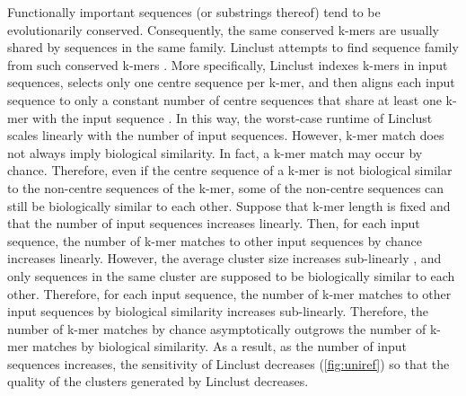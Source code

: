 \documentclass[11pt,letterpaper]{article}
\begin{document}
Functionally important sequences (or substrings thereof) tend to be evolutionarily conserved.
Consequently, the same conserved k-mers are usually shared by sequences in the same family.
Linclust attempts to find sequence family from such conserved k-mers \citep{steinegger2017linclust}.
More specifically, 
	Linclust indexes k-mers in input sequences, 
	selects only one centre sequence per k-mer,
	and then aligns each input sequence to only a constant number of centre sequences that share at least one k-mer with the input sequence \citep{steinegger2017linclust}.
In this way, the worst-case runtime of Linclust scales linearly with the number of input sequences.
However, k-mer match does not always imply biological similarity.
In fact, a k-mer match may occur by chance.
Therefore,
	even if the centre sequence of a k-mer is not biological similar to the non-centre sequences of the k-mer, 
	some of the non-centre sequences can still be biologically similar to each other.
Suppose that k-mer length is fixed and that the number of input sequences increases linearly.
Then, for each input sequence,
	the number of k-mer matches to other input sequences by chance increases linearly.
However,
	the average cluster size increases sub-linearly \citep[Fig. 3]{suzek2014uniref},
	and only sequences in the same cluster are supposed to be biologically similar to each other.
Therefore,
	for each input sequence,
	the number of k-mer matches to other input sequences by biological similarity increases sub-linearly.
Therefore, the number of k-mer matches by chance asymptotically outgrows the number of k-mer matches by biological similarity.
As a result, as the number of input sequences increases, 
	the sensitivity of Linclust decreases (\cref{fig:uniref}) so that the quality of the clusters generated by Linclust decreases.


\end{document}
